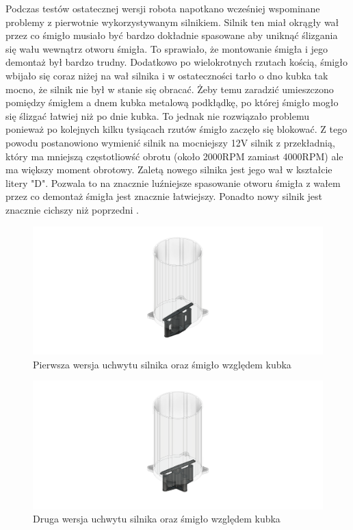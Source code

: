 Podczas testów ostatecznej wersji robota napotkano wcześniej wspominane problemy z pierwotnie wykorzystywanym silnikiem. Silnik ten miał okrągły wał przez co śmigło musiało
być bardzo dokładnie spasowane aby uniknąć ślizgania się wału wewnątrz otworu śmigła. To sprawiało, że montowanie śmigła i jego demontaż był bardzo trudny. Dodatkowo po wielokrotnych rzutach kością, śmigło
wbijało się coraz niżej na wał silnika i w ostateczności tarło o dno kubka tak mocno, że silnik nie był w stanie się obracać. 
Żeby temu zaradzić umieszczono pomiędzy śmigłem a dnem kubka metalową podkłądkę, po której śmigło mogło się ślizgać łatwiej niż po dnie kubka. To
jednak nie rozwiązało problemu ponieważ po kolejnych kilku tysiącach rzutów śmigło zaczęło się blokować. 
Z tego powodu postanowiono wymienić silnik na mocniejszy 12V silnik z przekładnią, który ma mniejszą częstotliowść obrotu (około 2000RPM zamiast 4000RPM) ale ma większy moment obrotowy.
Zaletą nowego silnika jest jego wał w kształcie litery "D". Pozwala to na znacznie luźniejsze spasowanie otworu śmigła z wałem przez co 
demontaż śmigła jest znacznie łatwiejszy. Ponadto nowy silnik jest znacznie cichszy niż poprzedni .

\begin{figure}[H]
    \centering
    \includegraphics[width=0.95\linewidth]{chapters/03-praca-wlasna/figures/uchwyt_v1.png}
    \caption{\label{fig:uchwyt_v1}Pierwsza wersja uchwytu silnika oraz śmigło względem kubka}
\end{figure}

\begin{figure}[H]
    \centering
    \includegraphics[width=0.95\linewidth]{chapters/03-praca-wlasna/figures/uchwyt_v2.png}
    \caption{\label{fig:uchwyt}Druga wersja uchwytu silnika oraz śmigło względem kubka}
\end{figure}

